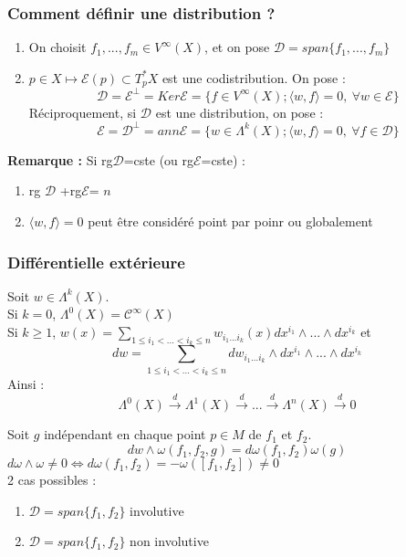 \subsubsection{Comment définir une distribution ?}
\begin{enumerate}
	\item On choisit $f_1,...,f_m\in V^\infty(X)$, et on pose $\mathcal{D}=span\{f_1,...,f_m\}$
	\item $p\in X\mapsto \mathscr{E}(p)\subset T_p^* X$ est une codistribution. On pose :
\[\mathcal{D}=\mathscr{E}^\perp = Ker\mathscr{E}=\{f\in V^\infty(X); \langle w,f\rangle =0,\ \forall w\in\mathscr{E}\}\]
Réciproquement, si $\mathcal{D}$ est une distribution, on pose :
\[\mathscr{E}=\mathcal{D}^\perp=ann\mathscr{E}=\{w\in\Lambda^k(X); \langle w,f\rangle =0,\ \forall f\in\mathcal{D}\}\]
\end{enumerate}

\textbf{Remarque :} Si rg$\mathcal{D}$=cste (ou rg$\mathscr{E}$=cste) :
\begin{enumerate}
	\item rg $\mathcal{D}$ +rg$\mathscr{E}$= $n$
	\item $\langle w,f\rangle=0$ peut être considéré point par poinr ou globalement
\end{enumerate}

\subsubsection{Différentielle extérieure}

Soit $w\in\Lambda^k(X)$.\\
Si $k=0$, $\Lambda^0(X)=\mathscr{C}^\infty(X)$ \\
Si $k\geq 1$, $w(x)=\sum_{1\leq i_1<...<i_k\leq n} w_{i_1...i_k}(x)dx^{i_1}\wedge...\wedge dx^{i_k}$ et
\[dw=\sum_{1\leq i_1<...<i_k\leq n} dw_{i_1...i_k}\wedge dx^{i_1}\wedge...\wedge dx^{i_k}\]
Ainsi :
\[\Lambda^0(X)\xrightarrow{d}\Lambda^1(X)\xrightarrow{d}...\xrightarrow{d}\Lambda^n(X)\xrightarrow{d} 0\]



Soit $g$ indépendant en chaque point $p\in M$ de $f_1$ et $f_2$.
\[dw\wedge \omega(f_1,f_2,g)=d\omega (f_1,f_2)\omega(g)\]
$d\omega\wedge\omega\neq 0 \Leftrightarrow d\omega(f_1,f_2)=-\omega([f_1,f_2])\neq 0$\\
2 cas possibles :
\begin{enumerate}
	\item $\mathcal{D}=span\{f_1,f_2\}$ involutive
	\item $\mathcal{D}=span\{f_1,f_2\}$ non involutive
\end{enumerate}

